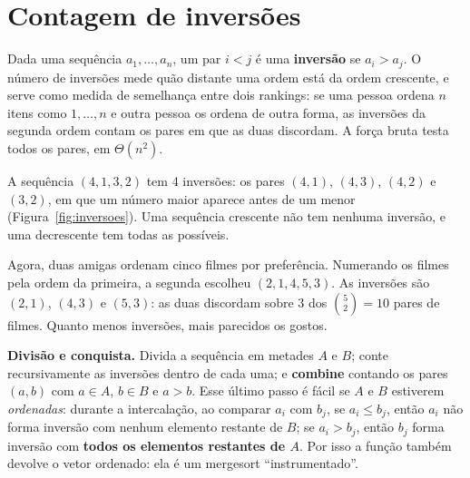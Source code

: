 \section{Contagem de inversões}\label{sec:inversoes}
Dada uma sequência $a_1,\dots,a_n$, um par $i<j$ é uma \textbf{inversão} se $a_i>a_j$. O número de inversões mede quão distante uma ordem está da ordem crescente, e serve como medida de semelhança entre dois rankings: se uma pessoa ordena $n$ itens como $1,\dots,n$ e outra pessoa os ordena de outra forma, as inversões da segunda ordem contam os pares em que as duas discordam. A força bruta testa todos os pares, em $\Theta(n^2)$.

\begin{exemplo}\label{ex:inversoes}
A sequência $(4,1,3,2)$ tem 4 inversões: os pares $(4,1)$, $(4,3)$, $(4,2)$ e $(3,2)$, em que um número maior aparece antes de um menor (Figura~\ref{fig:inversoes}). Uma sequência crescente não tem nenhuma inversão, e uma decrescente tem todas as possíveis.

Agora, duas amigas ordenam cinco filmes por preferência. Numerando os filmes pela ordem da primeira, a segunda escolheu $(2,1,4,5,3)$. As inversões são $(2,1)$, $(4,3)$ e $(5,3)$: as duas discordam sobre 3 dos $\binom52=10$ pares de filmes. Quanto menos inversões, mais parecidos os gostos.
\begin{figura}
\end{figura}
\end{exemplo}

\textbf{Divisão e conquista.} Divida a sequência em metades $A$ e $B$; conte recursivamente as inversões dentro de cada uma; e \textbf{combine} contando os pares $(a,b)$ com $a\in A$, $b\in B$ e $a>b$. Esse último passo é fácil se $A$ e $B$ estiverem \emph{ordenadas}: durante a intercalação, ao comparar $a_i$ com $b_j$, se $a_i\le b_j$, então $a_i$ não forma inversão com nenhum elemento restante de $B$; se $a_i>b_j$, então $b_j$ forma inversão com \textbf{todos os elementos restantes de $A$}. Por isso a função também devolve o vetor ordenado: ela é um mergesort ``instrumentado''.

